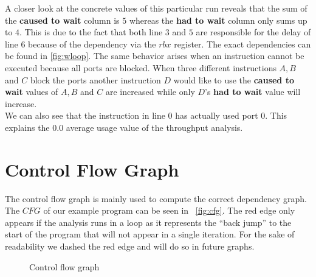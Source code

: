 A closer look at the concrete values of this particular run reveals that the sum of the \textbf{caused to wait} column is $5$ whereas the \textbf{had to wait} column only sums up to $4$. This is due to the fact that both line $3$ and $5$ are responsible for the delay of line $6$ because of the dependency via the $rbx$ register. The exact dependencies can be found in \autoref{fig:wloop}. The same behavior arises when an instruction cannot be executed because all ports are blocked. When three different instructions $A, B$ and $C$ block the ports another instruction $D$ would like to use the \textbf{caused to wait} values of $A, B$ and $C$ are increased while only $D$'s \textbf{had to wait} value will increase.\\
We can also see that the instruction in line $0$ has actually used port $0$. This explains the $0.0$ average usage value of the throughput analysis.

\section{Control Flow Graph}
The control flow graph is mainly used to compute the correct dependency graph. The $CFG$ of our example program can be seen in ~\autoref{fig:cfg}. The red edge only appears if the analysis runs in a loop as it represents the ``back jump'' to the start of the program that will not appear in a single iteration. For the sake of readability we dashed the red edge and will do so in future graphs.

\begin{figure}
    \centering
    \caption{Control flow graph}
    \label{fig:cfg}
\end{figure}

